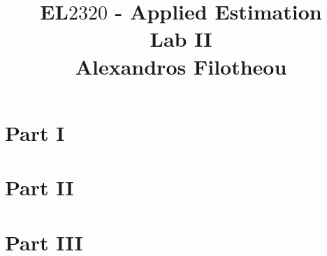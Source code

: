 \documentclass[oneside,12pt]{article}
\title{EL$2320$ - Applied Estimation \\ Lab II \\ Alexandros Filotheou}
\date{}
\begin{document}
	\maketitle
	

	\section{Part I}
			
		\newpage
		
		
	\section{Part II}
		
		\newpage
	
	\section{Part III}

			
\end{document}
